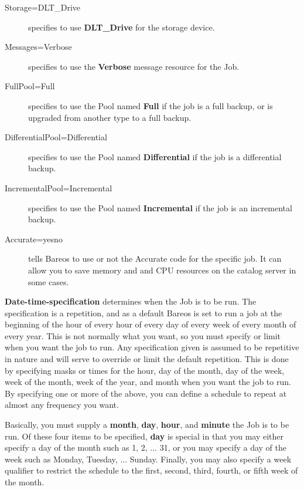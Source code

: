 {\begin{description}
\item [Storage=DLT\_Drive]
specifies to use {\bf DLT\_Drive} for  the storage device.

\item [Messages=Verbose]
specifies to use the {\bf Verbose}  message resource for the Job.

\item [FullPool=Full]
specifies to use the Pool named {\bf Full}  if the job is a full backup, or
is upgraded from another type  to a full backup.

\item [DifferentialPool=Differential]
specifies to use the Pool named {\bf Differential} if the job is a
differential  backup.

\item [IncrementalPool=Incremental]
specifies to use the Pool  named {\bf Incremental} if the job is an
incremental  backup.

\item [Accurate=yes{\textbar}no]
tells Bareos to use or not the Accurate code for the specific job. It can
allow you to save memory and and CPU resources on the catalog server in some
cases.

\end{description}

{\bf Date-time-specification} determines when the  Job is to be run. The
specification is a repetition, and as  a default Bareos is set to run a job at
the beginning of the  hour of every hour of every day of every week of every
month  of every year. This is not normally what you want, so you  must specify
or limit when you want the job to run. Any  specification given is assumed to
be repetitive in nature and  will serve to override or limit the default
repetition. This  is done by specifying masks or times for the hour, day of the
month, day of the week, week of the month, week of the year,  and month when
you want the job to run. By specifying one or  more of the above, you can
define a schedule to repeat at  almost any frequency you want.

Basically, you must supply a {\bf month}, {\bf day}, {\bf hour}, and  {\bf
minute} the Job is to be run. Of these four items to be specified,  {\bf day}
is special in that you may either specify a day of the month  such as 1, 2,
... 31, or you may specify a day of the week such  as Monday, Tuesday, ...
Sunday. Finally, you may also specify a  week qualifier to restrict the
schedule to the first, second, third,  fourth, or fifth week of the month.

}
